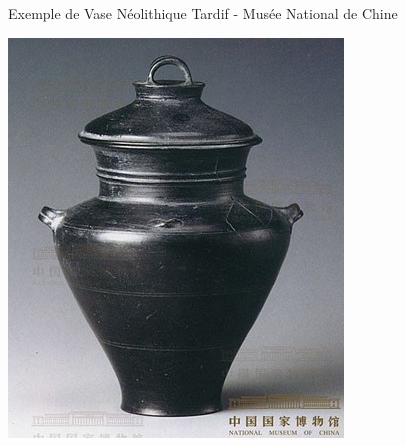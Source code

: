  
\begin{marginfigure}
    \caption{Exemple de Vase Néolithique Tardif - Musée National de Chine}
    \includegraphics[width=\textwidth]{ConfucianismeTaoismeBouddhismeChinois/Images/NeolithiqueTardifNationalMuseum.jpg}

\end{marginfigure}
\FloatBarrier
